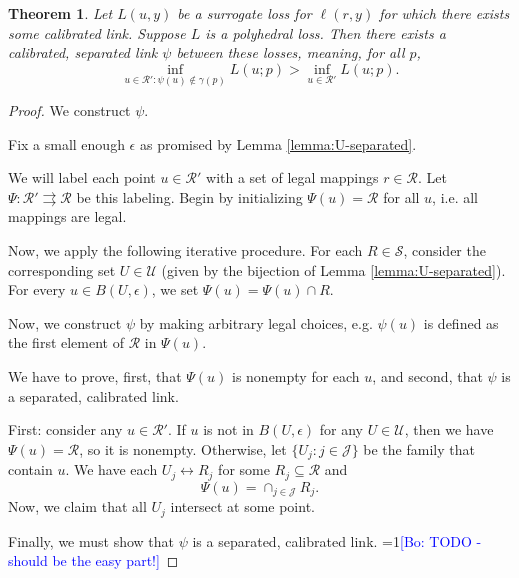 \documentclass{article}
\newcommand{\Comments}{1}
\newcommand{\mynote}[2]{\ifnum\Comments=1\textcolor{#1}{#2}\fi}
\newcommand{\bo}[1]{\mynote{blue}{[Bo: #1]}}
\newcommand{\R}{\mathcal{R}}
\newcommand{\toto}{\rightrightarrows}
\newtheorem{theorem}{Theorem}
\begin{document}
\begin{theorem}
  Let $L(u,y)$ be a surrogate loss for $\ell(r,y)$ for which there exists some calibrated link.
  Suppose $L$ is a polyhedral loss.
  Then there exists a calibrated, \emph{separated} link $\psi$ between these losses, meaning, for all $p$,
    \[ \inf_{u \in \R' : \psi(u) \not\in \gamma(p)} L(u;p) > \inf_{u \in \R'} L(u;p) . \]
\end{theorem}
\begin{proof}
We construct $\psi$.

Fix a small enough $\epsilon$ as promised by Lemma \ref{lemma:U-separated}.

We will label each point $u \in \R'$ with a set of legal mappings $r \in \R$.
Let $\Psi: \R' \toto \R$ be this labeling.
Begin by initializing $\Psi(u) = \R$ for all $u$, i.e. all mappings are legal.

Now, we apply the following iterative procedure.
For each $R \in \mathcal{S}$, consider the corresponding set $U \in \mathcal{U}$ (given by the bijection of Lemma \ref{lemma:U-separated}).
For every $u \in B\left(U, \epsilon\right)$, we set $\Psi(u) = \Psi(u) \cap R$.


Now, we construct $\psi$ by making arbitrary legal choices, e.g. $\psi(u)$ is defined as the first element of $\R$ in $\Psi(u)$.

We have to prove, first, that $\Psi(u)$ is nonempty for each $u$, and second, that $\psi$ is a separated, calibrated link.

First: consider any $u \in \R'$.
If $u$ is not in $B(U,\epsilon)$ for any $U \in \mathcal{U}$, then we have $\Psi(u) = \R$, so it is nonempty.
Otherwise, let $\{U_j : j \in \mathcal{J}\}$ be the family that contain $u$.
We have each $U_j \leftrightarrow R_j$ for some $R_j \subseteq \R$ and
  \[ \Psi(u) = \cap_{j \in \mathcal{J}} R_j . \]
Now, we claim that all $U_j$ intersect at some point.

Finally, we must show that $\psi$ is a separated, calibrated link.
\bo{TODO - should be the easy part!}
\end{proof}
\end{document}
